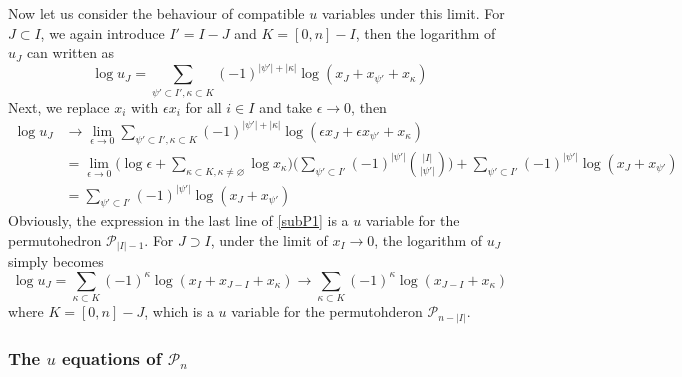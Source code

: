 \documentclass[hidelinks,12pt]{article}
\begin{document}
Now let us consider the behaviour of compatible $u$ variables under this limit. For $J\subset I$, we again introduce $I'=I-J$ and $K=[0,n]-I$, then the logarithm of $u_{J}$ can written as 
\begin{equation}
     \log u_{J}=\sum_{\psi'\subset I', \kappa \subset K} (-1)^{\lvert \psi'\rvert +\lvert \kappa \rvert} \log (x_{J}+x_{\psi'}+x_{\kappa})
\end{equation}
Next, we replace $x_{i}$ with $ \epsilon x_{i}$ for all $i\in I$ and take $\epsilon \to 0$, then 
\begin{align}
   \log u_{J} &\to \lim_{\epsilon \to 0} \sum_{\psi'\subset I', \kappa \subset K} (-1)^{\lvert \psi'\rvert +\lvert \kappa \rvert} \log (\epsilon x_{J}+ \epsilon x_{\psi'}+x_{\kappa}) \nonumber  \\
    &=\lim_{\epsilon\to 0} \biggl(\log \epsilon+\sum_{\kappa\subset K,\kappa \neq \varnothing}\log x_{\kappa}\biggr)\Biggr( \sum_{\psi'\subset I'}(-1)^{\lvert\psi'\rvert}\binom{\lvert I \rvert }{\lvert  \psi' \rvert }\Biggr)
    +\sum_{\psi'\subset I'} (-1)^{\lvert \psi'\rvert }\log (x_{J}+x_{\psi'}) \nonumber \\
    &=\sum_{\psi'\subset I'} (-1)^{\lvert \psi'\rvert }\log (x_{J}+x_{\psi'}) \label{subP1}
\end{align}
Obviously, the expression in the last line of \eqref{subP1} is a $u$ variable for the permutohedron $\mathscr{P}_{\lvert I\rvert -1}$. For $J\supset I$, under the limit of $x_I\to 0$, the logarithm of $u_{J}$ simply becomes 
\begin{equation}
   \log u_{J} = \sum_{\kappa \subset K} (-1)^{\kappa} \log (x_{I}+x_{J-I}+x_{\kappa}) 
   \to  \sum_{\kappa \subset K} (-1)^{\kappa} \log (x_{J-I}+x_{\kappa}) 
\end{equation}
where $K=[0,n]-J$, which is a $u$ variable for the permutohderon $\mathscr{P}_{n-\lvert I\rvert}$. 

\subsubsection{The $u$ equations of ${\mathscr P_n}$}
\end{document}
